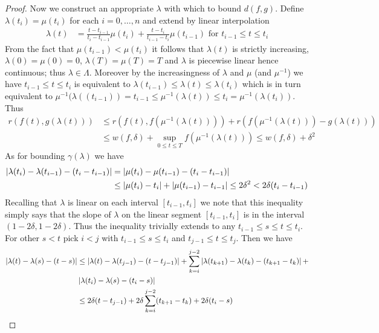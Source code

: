 \begin{proof}
Now we construct an appropriate $\lambda$ with which to bound $d(f,g)$.  
Define $\lambda(t_i) = \mu(t_i)$ for each $i=0,\dotsc, n$ and extend by linear
interpolation
\begin{align*}
\lambda(t) &= \frac{t-t_{i-1}}{t_i-t_{i-1}} \mu(t_i) + \frac{t-t_{i}}{t_{i-1}-t_{i}} \mu(t_{i-1}) \text{ for $t_{i-1} \leq t \leq t_i$}
\end{align*}
From the fact that $\mu(t_{i-1}) < \mu(t_i)$ it follows that $\lambda(t)$ is strictly increasing, $\lambda(0) = \mu(0) = 0$, 
$\lambda(T) = \mu(T) = T$ and $\lambda$ is piecewise linear hence continuous; thus $\lambda \in \Lambda$.  Moreover by
the increasingness of $\lambda$ and $\mu$ (and $\mu^{-1}$) we have $t_{i-1} \leq t \leq t_i$ is equivalent to $\lambda(t_{i-1}) \leq \lambda(t) \leq \lambda(t_i)$
which is in turn equivalent to $\mu^{-1}(\lambda((t_{i-1})) = t_{i-1} \leq \mu^{-1}(\lambda(t)) \leq t_i = \mu^{-1}(\lambda( t_i))$.
Thus
\begin{align*}
r(f(t), g(\lambda(t))) &\leq r(f(t), f(\mu^{-1}(\lambda(t))))  + r(f(\mu^{-1}(\lambda(t)))- g(\lambda(t))) \\
&\leq w(f,\delta) + \sup_{0 \leq t \leq T}  f(\mu^{-1}(\lambda(t))) \leq w(f,\delta) + \delta^2
\end{align*}
As for bounding $\gamma(\lambda)$ we have
\begin{align*}
\left \vert \lambda(t_i) - \lambda(t_{i-1}) - (t_i - t_{i-1}) \right \vert &= \left \vert \mu(t_i) - \mu(t_{i-1}) - (t_i - t_{i-1}) \right \vert \\
&\leq \left \vert \mu(t_i) -  t_{i} \right \vert  + \left \vert \mu(t_{i-1}) - t_{i-1} \right \vert \leq 2 \delta^2 < 2 \delta (t_i - t_{i-1})
\end{align*}
Recalling that $\lambda$ is linear on each interval $[t_{i-1},t_i]$ we note that this inequality simply says that the
slope of $\lambda$ on the linear segment $[t_{i-1},t_i]$ is in the interval $(1 - 2\delta, 1-2\delta)$.  Thus the inequality trivially extends 
to any $t_{i-1} \leq s \leq t \leq t_i$.  For other $s<t$  pick $i<j$ with $t_{i-1} \leq s \leq t_i$ and $t_{j-1} \leq t \leq t_j$.  Then we have
\begin{align*}
\abs{\lambda(t) - \lambda(s) - (t-s)} 
&\leq \abs{\lambda(t) - \lambda(t_{j-1}) - (t-t_{j-1})} + \sum_{k=i}^{j-2} \abs{\lambda(t_{k+1}) - \lambda(t_{k}) - (t_{k+1}-t_{k})}  + \\
&\abs{\lambda(t_i) - \lambda(s) - (t_i-s)} \\
&\leq 2 \delta (t-t_{j-1}) + 2 \delta \sum_{k=i}^{j-2} (t_{k+1}-t_{k})  + 2\delta (t_i-s) \\

\end{align*}
\end{proof}
